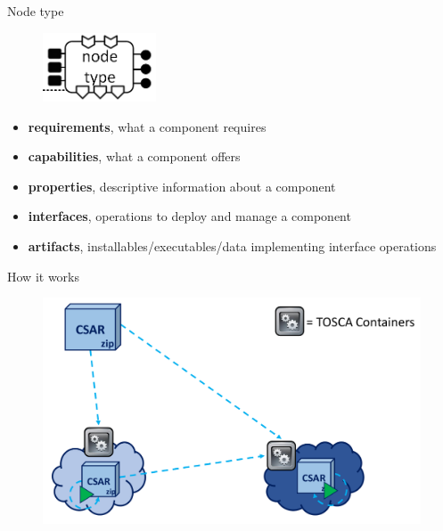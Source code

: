 \documentclass{beamer}
\begin{document}
  \begin{frame}{Node type}
    \begin{figure}
      \includegraphics[width=0.3\textwidth]{img/tosca_node_type.png}
    \end{figure}
    \begin{itemize}
      \item \textbf{requirements}, what a component requires
      \item \textbf{capabilities}, what a component offers
      \item \textbf{properties}, descriptive information about a component
      \item \textbf{interfaces}, operations to deploy and manage a component
      \item \textbf{artifacts}, installables/executables/data implementing interface operations
    \end{itemize}
  \end{frame}

  \begin{frame}{How it works}
    \begin{figure}
      \includegraphics[width=\textwidth]{img/tosca_how.png}
    \end{figure}
  \end{frame}
\end{document}
